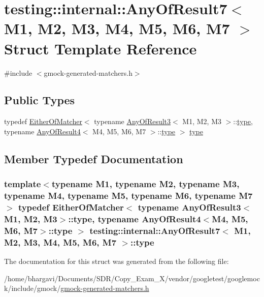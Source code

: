\hypertarget{structtesting_1_1internal_1_1_any_of_result7}{}\section{testing\+:\+:internal\+:\+:Any\+Of\+Result7$<$ M1, M2, M3, M4, M5, M6, M7 $>$ Struct Template Reference}
\label{structtesting_1_1internal_1_1_any_of_result7}


{\ttfamily \#include $<$gmock-\/generated-\/matchers.\+h$>$}

\subsection*{Public Types}
\begin{DoxyCompactItemize}
\item 
typedef \hyperlink{classtesting_1_1internal_1_1_either_of_matcher}{Either\+Of\+Matcher}$<$ typename \hyperlink{structtesting_1_1internal_1_1_any_of_result3}{Any\+Of\+Result3}$<$ M1, M2, M3 $>$\+::\hyperlink{structtesting_1_1internal_1_1_any_of_result7_a976873478921520833464a86f840abe8}{type}, typename \hyperlink{structtesting_1_1internal_1_1_any_of_result4}{Any\+Of\+Result4}$<$ M4, M5, M6, M7 $>$\+::\hyperlink{structtesting_1_1internal_1_1_any_of_result7_a976873478921520833464a86f840abe8}{type} $>$ \hyperlink{structtesting_1_1internal_1_1_any_of_result7_a976873478921520833464a86f840abe8}{type}
\end{DoxyCompactItemize}


\subsection{Member Typedef Documentation}
\subsubsection[{\texorpdfstring{type}{type}}]{\setlength{\rightskip}{0pt plus 5cm}template$<$typename M1, typename M2, typename M3, typename M4, typename M5, typename M6, typename M7$>$ typedef {\bf Either\+Of\+Matcher}$<$ typename {\bf Any\+Of\+Result3}$<$M1, M2, M3$>$\+::{\bf type}, typename {\bf Any\+Of\+Result4}$<$M4, M5, M6, M7$>$\+::{\bf type} $>$ {\bf testing\+::internal\+::\+Any\+Of\+Result7}$<$ M1, M2, M3, M4, M5, M6, M7 $>$\+::{\bf type}}\hypertarget{structtesting_1_1internal_1_1_any_of_result7_a976873478921520833464a86f840abe8}{}\label{structtesting_1_1internal_1_1_any_of_result7_a976873478921520833464a86f840abe8}


The documentation for this struct was generated from the following file\+:\begin{DoxyCompactItemize}
\item 
/home/bhargavi/\+Documents/\+S\+D\+R/\+Copy\+\_\+\+Exam\+\_\+X/vendor/googletest/googlemock/include/gmock/\hyperlink{gmock-generated-matchers_8h}{gmock-\/generated-\/matchers.\+h}\end{DoxyCompactItemize}
